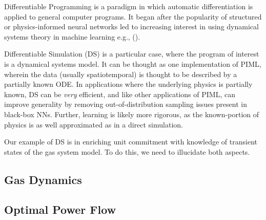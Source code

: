 Differentiable Programming is a paradigm in which automatic differentiation is applied to general computer programs. It began after the popularity of structured or physics-informed neural networks led to increasing interest in using dynamical systems theory in machine learning e.g., (\cite{chen2019}).

Differentiable Simulation (DS) is a particular case, where the program of interest is a dynamical systems model. It can be thought as one implementation of PIML, wherein the data (usually spatiotemporal) is thought to be described by a partially known ODE. In applications where the underlying physics is partially known, DS can be \textit{very} efficient, and like other applications of PIML, can improve generality by removing out-of-distribution sampling issues present in black-box NNs. Further, learning is likely more rigorous, as the known-portion of physics is as well approximated as in a direct simulation.

Our example of DS is in enriching unit commitment with knowledge of transient states of the gas system model. To do this, we need to illucidate both aspects.

\subsection{Gas Dynamics}

\subsection{Optimal Power Flow}

